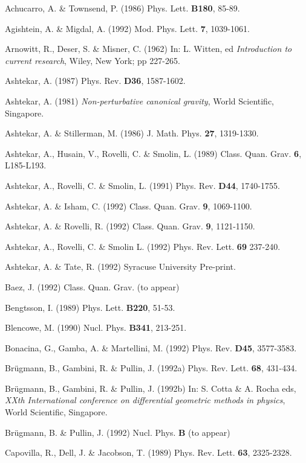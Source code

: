 \item{}{Achucarro, A. \& Townsend, P. (1986) Phys. Lett. {\bf B180}, 85-89.}
\item{}{Agishtein, A. \& Migdal, A. (1992) Mod. Phys. Lett. {\bf 7},
1039-1061.}
\item{}{ Arnowitt, R., Deser, S. \& Misner, C. (1962) In: L. Witten, ed
{\it Introduction to current research}, Wiley, New York; pp 227-265.}
\item{}{Ashtekar, A. (1987) Phys. Rev. {\bf D36}, 1587-1602.}
\item{}{Ashtekar, A. (1981) {\it Non-perturbative canonical gravity}, World
Scientific, Singapore.}
\item{}{Ashtekar, A. \& Stillerman, M. (1986) J. Math. Phys. {\bf 27},
1319-1330.}
\item{}{Ashtekar, A., Husain, V., Rovelli, C. \& Smolin, L. (1989) Class.
Quan. Grav. {\bf 6}, L185-L193.}
\item{}{Ashtekar, A.,  Rovelli, C. \& Smolin, L. (1991) Phys. Rev. {\bf D44},
1740-1755.}
\item{}{Ashtekar, A. \& Isham, C. (1992) Class. Quan. Grav. {\bf 9},
1069-1100.}
\item{}{Ashtekar, A. \& Rovelli, R. (1992) Class. Quan. Grav. {\bf 9},
1121-1150.}
\item{}{Ashtekar, A., Rovelli, C. \& Smolin L. (1992) Phys. Rev. Lett. {\bf 69}
237-240.}
\item{}{Ashtekar, A. \& Tate, R. (1992) Syracuse University Pre-print.}
\item{}{Baez, J. (1992) Class. Quan. Grav. (to appear)}
\item{}{Bengtsson, I. (1989) Phys. Lett. {\bf B220}, 51-53.}
\item{}{Blencowe, M. (1990) Nucl. Phys. {\bf B341}, 213-251.}
\item{}{Bonacina, G., Gamba, A. \& Martellini, M. (1992) Phys. Rev.
{\bf D45}, 3577-3583.}
\item{}{Br\"ugmann, B., Gambini, R. \& Pullin, J. (1992a) Phys. Rev. Lett.
{\bf 68}, 431-434.}
\item{}{Br\"ugmann, B., Gambini, R. \& Pullin, J. (1992b) In: S. Cotta \&
A. Rocha eds, {\it XXth International conference on differential geometric
methods in physics}, World Scientific, Singapore.}
\item{}{Br\"ugmann, B. \& Pullin, J. (1992) Nucl. Phys. {\bf B} (to appear)}
\item{}{Capovilla, R., Dell, J. \& Jacobson, T. (1989) Phys. Rev. Lett.
{\bf 63}, 2325-2328.}
